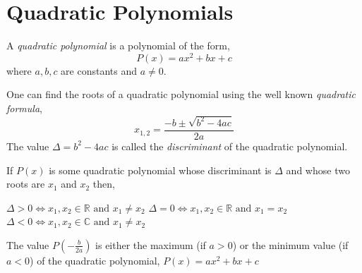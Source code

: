 \section{Quadratic Polynomials}
\begin{definition}
    A \textit{quadratic polynomial} is a polynomial of the form,
    \[
        P(x) = ax^{2} + bx + c
    \]
    where $a,b,c$ are constants and $a\neq 0$.
\end{definition}
One can find the roots of a quadratic polynomial using the well known \textit{quadratic formula},
\[
    x_{1,2} = \frac{-b \pm \sqrt{b^{2} - 4ac}}{2a}
\]
The value $\Delta = b^{2} - 4ac$ is called the \textit{discriminant} of the quadratic polynomial. 
\begin{theorem}
    If $P(x)$ is some quadratic polynomial whose discriminant is $\Delta$ and 
    whose two roots are $x_{1}$ and $x_{2}$ then,
    \begin{itemize}
            \ii $\Delta>0 \iff x_{1}, x_{2} \in \mathbb{R} \text{ and } x_{1}\neq x_{2}$
            \ii $\Delta=0 \iff x_{1}, x_{2} \in \mathbb{R} \text{ and } x_{1}=x_{2}$
            \ii $\Delta<0 \iff x_{1}, x_{2} \in \mathbb{C} \text{ and } x_{1}\neq x_{2}$
    \end{itemize}
\end{theorem}

\begin{theorem}
    The value $P\left(-\frac{b}{2a}\right)$ is either the maximum (if $a>0$) or the minimum value (if $a<0$) of 
    the quadratic polynomial, $P(x)=ax^{2} + bx + c$
\end{theorem}

